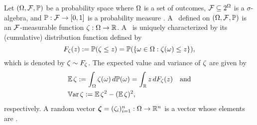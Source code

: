 Let $(\Omega, \mathcal{F}, \mathbb{P})$ be a probability space where $\Omega$ is a set of
outcomes, $\mathcal{F} \subseteq 2^\Omega$ is a $\sigma$-algebra, and
$\mathbb{P}: \mathcal{F} \to [0, 1]$ is a probability measure
\cite{durrett2010}. A \rv\ defined on $(\Omega, \mathcal{F}, \mathbb{P})$ is an
$\mathcal{F}$-measurable function $\zeta: \Omega \to \mathbb{R}$. A \rv\ is
uniquely characterized by its (cumulative) distribution function defined by
\begin{equation*}
  F_\zeta(z) := \mathbb{P}(\zeta \leq z) = \mathbb{P}(\{ \omega \in \Omega: \zeta(\omega) \leq z \}),
\end{equation*}
which is denoted by $\zeta \sim F_\zeta$. The expected value and variance
of $\zeta$ are given by
\begin{align}
  & \expectation{\h} := \int_\outcomes \h(\o) \, d\probabilityMeasure(\o) = \int_\real z \, d \distribution_\h(z) \hspace{1em} \text{and} \elab{expectation} \\
  & \variance{\h} := \expectation{\h^2} - (\expectation{\h})^2, \elab{variance}
\end{align}
respectively. A random vector $\bm{\zeta} = (\zeta_i)_{i = 1}^n: \Omega \to \mathbb{R}^n$ is
a vector whose elements are \rvs.
